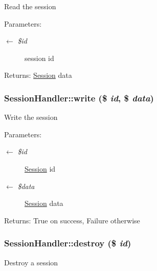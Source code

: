 Read the session

\begin{Desc}
\item[Parameters:]
\begin{description}
\item[\mbox{$\leftarrow$} {\em \$id}]session id \end{description}
\end{Desc}
\begin{Desc}
\item[Returns:]\hyperlink{classSession}{Session} data \end{Desc}
\hypertarget{classSessionHandler_b59071ef0d3deee2472c6916471bd9f5}{
\subsubsection{\setlength{\rightskip}{0pt plus 5cm}SessionHandler::write (\$ {\em id}, \$ {\em data})}}
\label{classSessionHandler_b59071ef0d3deee2472c6916471bd9f5}


Write the session

\begin{Desc}
\item[Parameters:]
\begin{description}
\item[\mbox{$\leftarrow$} {\em \$id}]\hyperlink{classSession}{Session} id \item[\mbox{$\leftarrow$} {\em \$data}]\hyperlink{classSession}{Session} data \end{description}
\end{Desc}
\begin{Desc}
\item[Returns:]True on success, Failure otherwise \end{Desc}
\hypertarget{classSessionHandler_4e43712ef307979de1b12039ef801adb}{
\subsubsection{\setlength{\rightskip}{0pt plus 5cm}SessionHandler::destroy (\$ {\em id})}}
\label{classSessionHandler_4e43712ef307979de1b12039ef801adb}


Destroy a session

